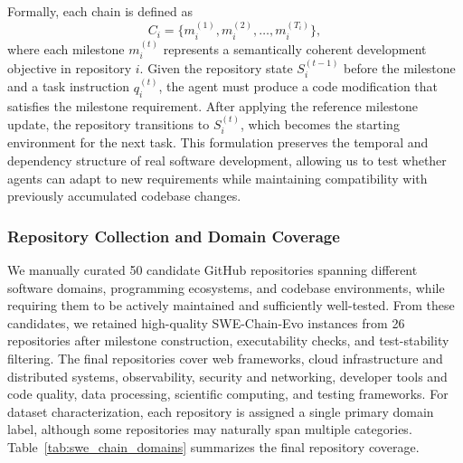 \documentclass{llmxive}
\begin{document}
Formally, each chain is defined as
\[
C_i = \{m_i^{(1)}, m_i^{(2)}, \ldots, m_i^{(T_i)}\},
\]
where each milestone \(m_i^{(t)}\) represents a semantically coherent development objective in repository \(i\). Given the repository state \(S_i^{(t-1)}\) before the milestone and a task instruction \(q_i^{(t)}\), the agent must produce a code modification that satisfies the milestone requirement. After applying the reference milestone update, the repository transitions to \(S_i^{(t)}\), which becomes the starting environment for the next task. This formulation preserves the temporal and dependency structure of real software development, allowing us to test whether agents can adapt to new requirements while maintaining compatibility with previously accumulated codebase changes.

\subsubsection{Repository Collection and Domain Coverage}
\label{app:swe_repository_collection}
We manually curated 50 candidate GitHub repositories spanning different software domains, programming ecosystems, and codebase environments, while requiring them to be actively maintained and sufficiently well-tested. From these candidates, we retained high-quality SWE-Chain-Evo instances from 26 repositories after milestone construction, executability checks, and test-stability filtering. The final repositories cover web frameworks, cloud infrastructure and distributed systems, observability, security and networking, developer tools and code quality, data processing, scientific computing, and testing frameworks. For dataset characterization, each repository is assigned a single primary domain label, although some repositories may naturally span multiple categories. Table~\ref{tab:swe_chain_domains} summarizes the final repository coverage.
\end{document}
